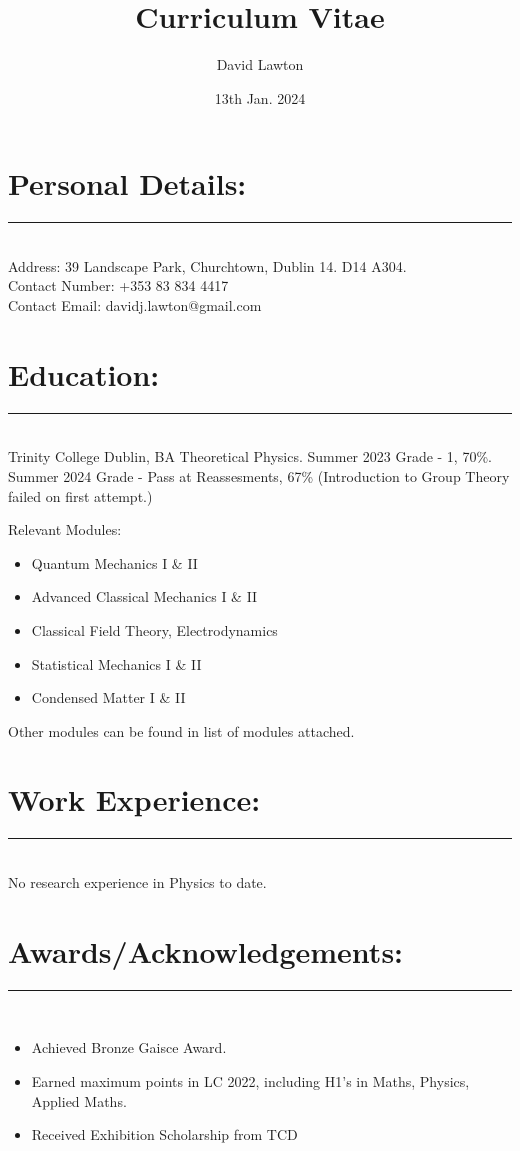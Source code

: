 \documentclass{article}
\title{Curriculum Vitae}
\author{David Lawton}
\date{13th Jan. 2024}
\begin{document}
\maketitle
\vfill

\section*{Personal Details:}
\hrule~\\
Address: 39 Landscape Park, Churchtown, Dublin 14. D14 A304.\\
Contact Number: +353 83 834 4417\\
Contact Email: davidj.lawton@gmail.com\\

\section*{Education:}
\hrule~\\

Trinity College Dublin, BA Theoretical Physics. Summer 2023 Grade - 1, 70\%. Summer 2024 Grade - Pass at Reassesments, 67\% (Introduction to Group Theory failed on first attempt.)

Relevant Modules:
\begin{itemize}
\item Quantum Mechanics I \& II
\item Advanced Classical Mechanics I \& II
\item Classical Field Theory, Electrodynamics
\item Statistical Mechanics I \& II
\item Condensed Matter I \& II
\end{itemize}
Other modules can be found in list of modules attached.

\section*{Work Experience:}
\hrule~\\
No research experience in Physics to date. 
\section*{Awards/Acknowledgements:}
\hrule~\\
\vspace{-3mm}
\begin{itemize}
\item Achieved Bronze Gaisce Award.
\item Earned maximum points in LC 2022, including H1's in Maths, Physics, Applied Maths.
\item Received Exhibition Scholarship from TCD
\end{itemize}
\end{document}
